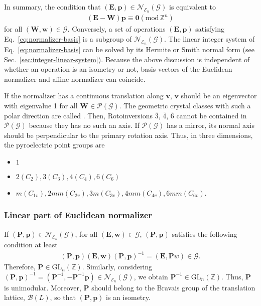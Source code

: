 In summary, the condition that $(\bm{E}, \bm{p} ) \in \mathcal{N}_{\mathcal{E}_{n}}(\mathcal{G})$ is equivalent to
\begin{align}
  \label{eq:normalizer-basis}
  (\bm{E} - \bm{W} ) \bm{p} \equiv \bm{0} ( \mathrm{mod} \, \mathbb{Z}^{n} )
\end{align}
for all $(\bm{W}, \bm{w}) \in \mathcal{G}$.
Conversely, a set of operations $(\bm{E}, \bm{p})$ satisfying Eq.~\eqref{eq:normalizer-basis} is a subgroup of $\mathcal{N}_{\mathcal{E}_{n}}(\mathcal{G})$.
The linear integer system of Eq.~\eqref{eq:normalizer-basis} can be solved by its Hermite or Smith normal form (see Sec.~\ref{sec:integer-linear-system}).
Because the above discussion is independent of whether an operation is an isometry or not, basis vectors of the Euclidean normalizer and affine normalizer can coincide.

If the normalizer has a continuous translation along $\bm{v}$, $\bm{v}$ should be an eigenvector with eigenvalue 1 for all $\bm{W} \in \mathcal{P}(\mathcal{G})$.
The geometric crystal classes with such a polar direction are called .
Then, Rotoinversions $\overline{3}$, $\overline{4}$, $\overline{6}$ cannot be contained in $\mathcal{P}(\mathcal{G})$ because they has no such an axis.
If $\mathcal{P}(\mathcal{G})$ has a mirror, its normal axis should be perpendicular to the primary rotation axis.
Thus, in three dimensions, the pyroelectric point groups are
\begin{itemize}
  \item $1$
  \item $2 (C_{2}), 3 (C_{3}), 4 (C_{4}), 6 (C_{6})$
  \item $m (C_{1v}), 2mm (C_{2v}), 3m (C_{3v}), 4mm (C_{4v}), 6mm (C_{6v})$.
\end{itemize}

\subsubsection{Linear part of Euclidean normalizer}

If $(\bm{P}, \bm{p} ) \in \mathcal{N}_{\mathcal{E}_{n}}(\mathcal{G})$, for all $(\bm{E}, \bm{w}) \in \mathcal{G}$, $(\bm{P}, \bm{p})$ satisfies the following condition at least
\begin{align}
  (\bm{P}, \bm{p}) (\bm{E}, \bm{w}) (\bm{P}, \bm{p})^{-1} = (\bm{E}, \bm{P}{w}) \in \mathcal{G}.
\end{align}
Therefore, $\bm{P} \in \mathrm{GL}_{n}(\mathbb{Z})$.
Similarly, considering $(\bm{P}, \bm{p} )^{-1} = (\bm{P}^{-1}, -\bm{P}^{-1}\bm{p} ) \in \mathcal{N}_{\mathcal{E}_{n}}(\mathcal{G})$, we obtain $\bm{P}^{-1} \in \mathrm{GL}_{n}(\mathbb{Z})$.
Thus, $\bm{P}$ is unimodular.
Moreover, $\bm{P}$ should belong to the Bravais group of the translation lattice, $\mathcal{B}(L)$, so that $(\bm{P}, \bm{p} )$ is an isometry.

